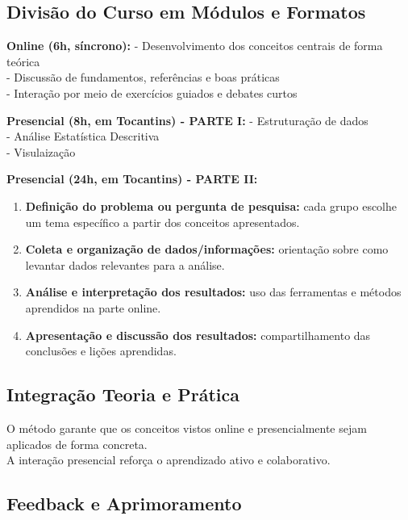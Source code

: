\documentclass[
  letterpaper,
  DIV=11,
  numbers=noendperiod]{scrreprt}
\providecommand{\tightlist}{%
  \setlength{\itemsep}{0pt}\setlength{\parskip}{0pt}}
\begin{document}
\subsection{Divisão do Curso em Módulos e
Formatos}\label{divisuxe3o-do-curso-em-muxf3dulos-e-formatos}

\textbf{Online (6h, síncrono):} - Desenvolvimento dos conceitos centrais
de forma teórica\\
- Discussão de fundamentos, referências e boas práticas\\
- Interação por meio de exercícios guiados e debates curtos

\textbf{Presencial (8h, em Tocantins) - PARTE I:} - Estruturação de
dados\\
- Análise Estatística Descritiva\\
- Visulaização

\textbf{Presencial (24h, em Tocantins) - PARTE II:}

\begin{enumerate}
\def\labelenumi{\arabic{enumi}.}
\tightlist
\item
  \textbf{Definição do problema ou pergunta de pesquisa:} cada grupo
  escolhe um tema específico a partir dos conceitos apresentados.\\
\item
  \textbf{Coleta e organização de dados/informações:} orientação sobre
  como levantar dados relevantes para a análise.\\
\item
  \textbf{Análise e interpretação dos resultados:} uso das ferramentas e
  métodos aprendidos na parte online.\\
\item
  \textbf{Apresentação e discussão dos resultados:} compartilhamento das
  conclusões e lições aprendidas.
\end{enumerate}

\subsection{Integração Teoria e
Prática}\label{integrauxe7uxe3o-teoria-e-pruxe1tica}

O método garante que os conceitos vistos online e presencialmente sejam
aplicados de forma concreta.\\
A interação presencial reforça o aprendizado ativo e colaborativo.

\subsection{Feedback e Aprimoramento}\label{feedback-e-aprimoramento}
\end{document}
